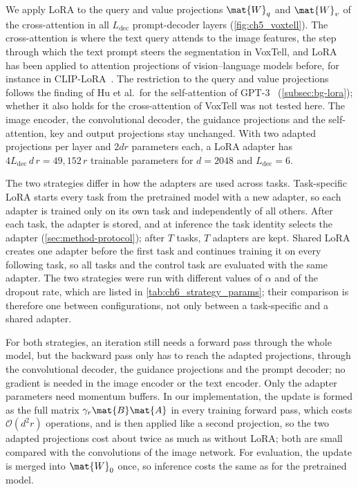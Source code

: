 We apply LoRA to the query and value projections $\mat{W}_q$ and $\mat{W}_v$ of the cross-attention in all $L_{\mathrm{dec}}$ prompt-decoder layers (\cref{fig:ch5_voxtell}).
The cross-attention is where the text query attends to the image features, the step through which the text prompt steers the segmentation in VoxTell, and LoRA has been applied to attention projections of vision--language models before, for instance in CLIP-LoRA~\cite{zanella2024lowrankfewshotadaptationvisionlanguage}.
The restriction to the query and value projections follows the finding of Hu et al.\ for the self-attention of GPT-3~\cite[Sec.~7.1, Table~5]{hu2022lora} (\cref{subsec:bg-lora}); whether it also holds for the cross-attention of VoxTell was not tested here.
The image encoder, the convolutional decoder, the guidance projections and the self-attention, key and output projections stay unchanged.
With two adapted projections per layer and $2dr$ parameters each, a LoRA adapter has $4 L_{\mathrm{dec}}\, d\, r = 49{,}152\, r$ trainable parameters for $d = 2048$ and $L_{\mathrm{dec}} = 6$.

The two strategies differ in how the adapters are used across tasks.
Task-specific LoRA starts every task from the pretrained model with a new adapter, so each adapter is trained only on its own task and independently of all others.
After each task, the adapter is stored, and at inference the task identity selects the adapter (\cref{sec:method-protocol}); after $T$ tasks, $T$ adapters are kept.
Shared LoRA creates one adapter before the first task and continues training it on every following task, so all tasks and the control task are evaluated with the same adapter.
The two strategies were run with different values of $\alpha$ and of the dropout rate, which are listed in \cref{tab:ch6_strategy_params}; their comparison is therefore one between configurations, not only between a task-specific and a shared adapter.

For both strategies, an iteration still needs a forward pass through the whole model, but the backward pass only has to reach the adapted projections, through the convolutional decoder, the guidance projections and the prompt decoder; no gradient is needed in the image encoder or the text encoder.
Only the adapter parameters need momentum buffers.
In our implementation, the update is formed as the full matrix $\gamma_r\mat{B}\mat{A}$ in every training forward pass, which costs $\mathcal{O}(d^2 r)$ operations, and is then applied like a second projection, so the two adapted projections cost about twice as much as without LoRA; both are small compared with the convolutions of the image network.
For evaluation, the update is merged into $\mat{W}_0$ once, so inference costs the same as for the pretrained model.

